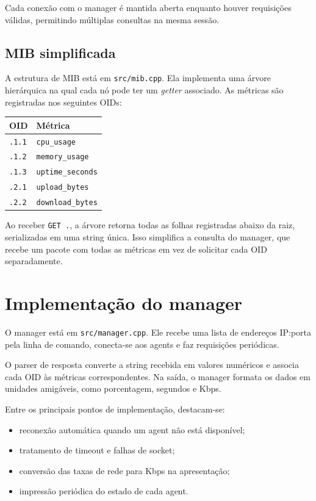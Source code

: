 \documentclass[12pt,a4paper]{article}
\begin{document}
Cada conexão com o manager é mantida aberta enquanto houver requisições válidas, permitindo múltiplas consultas na mesma sessão.

\subsection{MIB simplificada}
A estrutura de MIB está em \texttt{src/mib.cpp}. Ela implementa uma árvore hierárquica na qual cada nó pode ter um \textit{getter} associado. As métricas são registradas nos seguintes OIDs:
\begin{center}
\begin{tabular}{ll}
\toprule
OID & Métrica \\
\midrule
\texttt{.1.1} & \texttt{cpu\_usage} \\
\texttt{.1.2} & \texttt{memory\_usage} \\
\texttt{.1.3} & \texttt{uptime\_seconds} \\
\texttt{.2.1} & \texttt{upload\_bytes} \\
\texttt{.2.2} & \texttt{download\_bytes} \\
\bottomrule
\end{tabular}
\end{center}

Ao receber \texttt{GET .}, a árvore retorna todas as folhas registradas abaixo da raiz, serializadas em uma string única. Isso simplifica a consulta do manager, que recebe um pacote com todas as métricas em vez de solicitar cada OID separadamente.

\section{Implementação do manager}
O manager está em \texttt{src/manager.cpp}. Ele recebe uma lista de endereços IP:porta pela linha de comando, conecta-se aos agents e faz requisições periódicas.

O parser de resposta converte a string recebida em valores numéricos e associa cada OID às métricas correspondentes. Na saída, o manager formata os dados em unidades amigáveis, como porcentagem, segundos e Kbps.

Entre os principais pontos de implementação, destacam-se:
\begin{itemize}
	\item reconexão automática quando um agent não está disponível;
	\item tratamento de timeout e falhas de socket;
	\item conversão das taxas de rede para Kbps na apresentação;
	\item impressão periódica do estado de cada agent.
\end{itemize}
\end{document}

